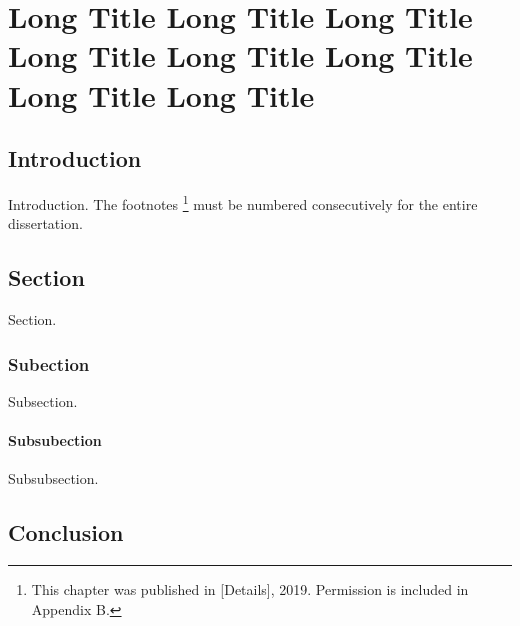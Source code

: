 \chapter{Long Title Long Title Long Title Long Title Long Title Long Title Long Title Long Title }
\section{Introduction}
Introduction. The footnotes \footnote[2]{This chapter was published in [Details], 2019. Permission is included in Appendix B.} must be numbered consecutively for the entire dissertation. 





\section{Section}
Section.

\subsection{Subection}
Subsection.
\subsubsection{Subsubection}
Subsubsection.



\section{Conclusion}


